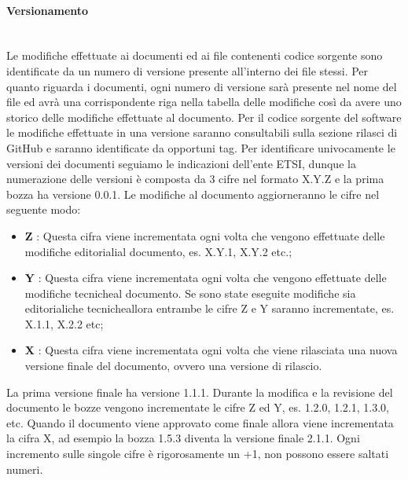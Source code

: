 		\paragraph{Versionamento}\mbox{}\\ [1mm]
		Le modifiche effettuate ai documenti ed ai file contenenti codice sorgente sono identificate da un numero di versione presente all'interno dei file stessi. Per quanto riguarda i documenti, ogni numero di versione sarà presente nel nome del file ed avrà una corrispondente riga nella tabella delle modifiche così da avere uno storico delle modifiche effettuate al documento. Per il codice sorgente del software le modifiche effettuate in una versione saranno consultabili sulla sezione rilasci di GitHub e saranno identificate da opportuni tag.
		\newline
		Per identificare univocamente le versioni dei documenti seguiamo le indicazioni dell'ente ETSI, dunque la numerazione delle versioni è composta da 3 cifre nel formato X.Y.Z e la prima bozza ha versione 0.0.1. Le modifiche al documento aggiorneranno le cifre nel seguente modo:
		\begin{itemize}
			\item \textbf{Z} : Questa cifra viene incrementata ogni volta che vengono effettuate delle modifiche editoriali\glosp al documento, es. X.Y.1, X.Y.2 etc.;
			\item \textbf{Y} : Questa cifra viene incrementata ogni volta che vengono effettuate delle modifiche tecniche\glosp al documento. Se sono state eseguite modifiche sia editoriali\glosp che tecniche\glosp allora entrambe le cifre Z e Y saranno incrementate, es. X.1.1, X.2.2 etc;
			\item \textbf{X} : Questa cifra viene incrementata ogni volta che viene rilasciata una nuova versione finale del documento, ovvero una versione di rilascio.			
		\end{itemize}
		La prima versione finale ha versione 1.1.1.
		\newline
		Durante la modifica e la revisione del documento le bozze vengono incrementate le cifre Z ed Y, es. 1.2.0, 1.2.1, 1.3.0, etc.
		\newline
		Quando il documento viene approvato come finale allora viene incrementata la cifra X, ad esempio la bozza 1.5.3 diventa la versione finale 2.1.1.
		\newline
		Ogni incremento sulle singole cifre è rigorosamente un +1, non possono essere saltati numeri.
		
